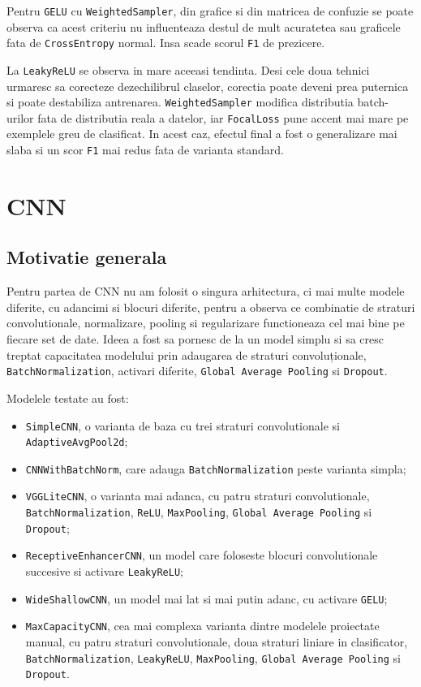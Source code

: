 \documentclass[12pt,a4paper]{article}
\begin{document}
Pentru \texttt{GELU} cu \texttt{WeightedSampler}, din grafice si din matricea de confuzie se poate observa ca acest criteriu nu influenteaza destul de mult acuratetea sau graficele fata de \texttt{CrossEntropy} normal. Insa scade scorul \texttt{F1} de prezicere.

La \texttt{LeakyReLU} se observa in mare aceeasi tendinta. Desi cele doua tehnici urmaresc sa corecteze dezechilibrul claselor, corectia poate deveni prea puternica si poate destabiliza antrenarea. \texttt{WeightedSampler} modifica distributia batch-urilor fata de distributia reala a datelor, iar \texttt{FocalLoss} pune accent mai mare pe exemplele greu de clasificat. In acest caz, efectul final a fost o generalizare mai slaba si un scor \texttt{F1} mai redus fata de varianta standard.

\section{CNN}

\subsection{Motivatie generala}

Pentru partea de CNN nu am folosit o singura arhitectura, ci mai multe modele diferite, cu adancimi si blocuri diferite, pentru a observa ce combinatie de straturi convolutionale, normalizare, pooling si regularizare functioneaza cel mai bine pe fiecare set de date. Ideea a fost sa pornesc de la un model simplu si sa cresc treptat capacitatea modelului prin adaugarea de straturi convoluționale, \texttt{BatchNormalization}, activari diferite, \texttt{Global Average Pooling} si \texttt{Dropout}.

Modelele testate au fost:
\begin{itemize}
    \item \texttt{SimpleCNN}, o varianta de baza cu trei straturi convolutionale si \texttt{AdaptiveAvgPool2d};
    \item \texttt{CNNWithBatchNorm}, care adauga \texttt{BatchNormalization} peste varianta simpla;
    \item \texttt{VGGLiteCNN}, o varianta mai adanca, cu patru straturi convolutionale, \texttt{BatchNormalization}, \texttt{ReLU}, \texttt{MaxPooling}, \texttt{Global Average Pooling} si \texttt{Dropout};
    \item \texttt{ReceptiveEnhancerCNN}, un model care foloseste blocuri convolutionale succesive si activare \texttt{LeakyReLU};
    \item \texttt{WideShallowCNN}, un model mai lat si mai putin adanc, cu activare \texttt{GELU};
    \item \texttt{MaxCapacityCNN}, cea mai complexa varianta dintre modelele proiectate manual, cu patru straturi convolutionale, doua straturi liniare in clasificator, \texttt{BatchNormalization}, \texttt{LeakyReLU}, \texttt{MaxPooling}, \texttt{Global Average Pooling} si \texttt{Dropout}.
\end{itemize}
\end{document}
